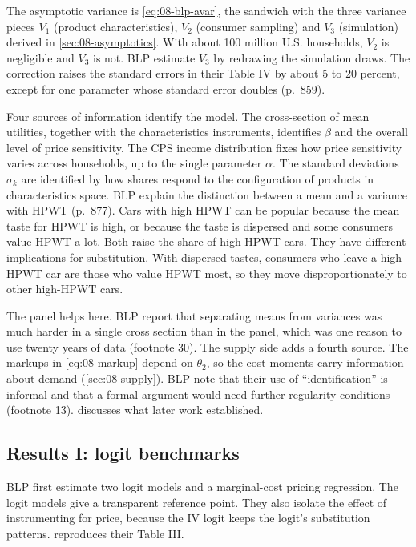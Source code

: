 The asymptotic variance is \eqref{eq:08-blp-avar}, the sandwich with the three variance pieces $V_1$
(product characteristics), $V_2$ (consumer sampling) and $V_3$ (simulation) derived in
\cref{sec:08-asymptotics}. With about 100 million U.S. households, $V_2$ is negligible and $V_3$ is not.
BLP estimate $V_3$ by redrawing the simulation draws. The correction raises the standard errors in their
Table IV by about 5 to 20 percent, except for one parameter whose standard error doubles (p.~859).

Four sources of information identify the model. The cross-section of mean utilities, together with the
characteristics instruments, identifies $\beta$ and the overall level of price sensitivity. The CPS
income distribution fixes how price sensitivity varies across households, up to the single parameter
$\alpha$. The standard deviations $\sigma_k$ are identified by how shares respond to the configuration
of products in characteristics space. BLP explain the distinction between a mean and a variance with
HPWT (p.~877). Cars with high HPWT can be popular because the mean taste for HPWT is high, or because
the taste is dispersed and some consumers value HPWT a lot. Both raise the share of high-HPWT cars.
They have different implications for substitution. With dispersed tastes, consumers who leave a
high-HPWT car are those who value HPWT most, so they move disproportionately to other high-HPWT cars.

The panel helps here. BLP report that separating means from variances was much harder in a single
cross section than in the panel, which was one reason to use twenty years of data (footnote 30). The
supply side adds a fourth source. The markups in \eqref{eq:08-markup} depend on $\theta_2$, so the
cost moments carry information about demand (\cref{sec:08-supply}). BLP note that their use of
``identification'' is informal and that a formal argument would need further regularity conditions
(footnote 13).  discusses what later work established.

\subsection{Results I: logit benchmarks}\label{sec:08-blp95-logit}

BLP first estimate two logit models and a marginal-cost pricing regression. The logit models give a
transparent reference point. They also isolate the effect of instrumenting for price, because the IV
logit keeps the logit's substitution patterns.  reproduces their Table III.

